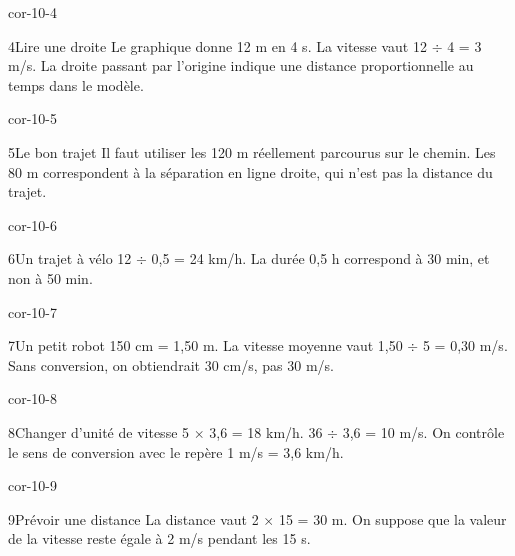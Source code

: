 \documentclass[12pt,twoside,openany]{book}
\begin{document}
\begin{blocLivre}{cor-10-4}
\begin{corrige}{4}{Lire une droite}
Le graphique donne 12 m en 4 s. La vitesse vaut 12 \(\div\) 4 = 3 m/s. La droite passant par l’origine indique une distance proportionnelle au temps dans le modèle.\par
{}
\end{corrige}\end{blocLivre}
\begin{blocLivre}{cor-10-5}
\begin{corrige}{5}{Le bon trajet}
Il faut utiliser les 120 m réellement parcourus sur le chemin. Les 80 m correspondent à la séparation en ligne droite, qui n’est pas la distance du trajet.\par
{}
\end{corrige}\end{blocLivre}
\begin{blocLivre}{cor-10-6}
\begin{corrige}{6}{Un trajet à vélo}
12 \(\div\) 0,5 = 24 km/h. La durée 0,5 h correspond à 30 min, et non à 50 min.\par
\end{corrige}\end{blocLivre}
\begin{blocLivre}{cor-10-7}
\begin{corrige}{7}{Un petit robot}
150 cm = 1,50 m. La vitesse moyenne vaut 1,50 \(\div\) 5 = 0,30 m/s. Sans conversion, on obtiendrait 30 cm/s, pas 30 m/s.\par
\end{corrige}\end{blocLivre}
\begin{blocLivre}{cor-10-8}
\begin{corrige}{8}{Changer d’unité de vitesse}
5 \(\times\) 3,6 = 18 km/h. 36 \(\div\) 3,6 = 10 m/s. On contrôle le sens de conversion avec le repère 1 m/s = 3,6 km/h.\par
\end{corrige}\end{blocLivre}
\begin{blocLivre}{cor-10-9}
\begin{corrige}{9}{Prévoir une distance}
La distance vaut 2 \(\times\) 15 = 30 m. On suppose que la valeur de la vitesse reste égale à 2 m/s pendant les 15 s.\par
\end{corrige}\end{blocLivre}
\end{document}
